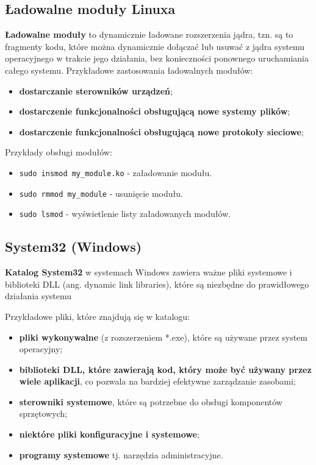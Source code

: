 \documentclass{article}
\begin{document}
\subsection{Ładowalne moduły Linuxa}
\textbf{Ładowalne moduły} to dynamicznie ładowane rozszerzenia jądra, tzn. są to fragmenty kodu, które można dynamicznie dołączać lub usuwać z jądra systemu operacyjnego w trakcie jego działania, bez konieczności ponownego uruchamiania całego systemu.
Przykładowe zastosowania ładowalnych modułów:
\begin{itemize}
    \item \textbf{dostarczanie sterowników urządzeń};
    \item \textbf{dostarczenie funkcjonalności obsługującą nowe systemy plików};
    \item \textbf{dostarczenie funkcjonalności obsługującą nowe protokoły sieciowe};
\end{itemize}

Przykłady obsługi modułów:
\begin{itemize}
    \item \texttt{sudo insmod my\_module.ko} - załadowanie modułu.
    \item \texttt{sudo rmmod my\_module} - usunięcie modułu.
    \item \texttt{sudo lsmod} - wyświetlenie listy załadowanych modułów.
\end{itemize}

\subsection{System32 (Windows)}
\textbf{Katalog System32} w systemach Windows zawiera ważne pliki systemowe i biblioteki DLL (ang. dynamic link libraries), które są niezbędne do prawidłowego działania systemu

Przykładowe pliki, które znajdują się w katalogu:
\begin{itemize}
    \item \textbf{pliki wykonywalne} (z rozszerzeniem *.exe), które są używane przez system operacyjny;
    \item \textbf{biblioteki DLL, które zawierają kod, który może być używany przez wiele aplikacji}, co pozwala na bardziej efektywne zarządzanie zasobami;
    \item \textbf{sterowniki systemowe}, które są potrzebne do obsługi komponentów sprzętowych;
    \item \textbf{niektóre pliki konfiguracyjne i systemowe};
    \item \textbf{programy systemowe} tj. narzędzia administracyjne.
\end{itemize}
\end{document}
